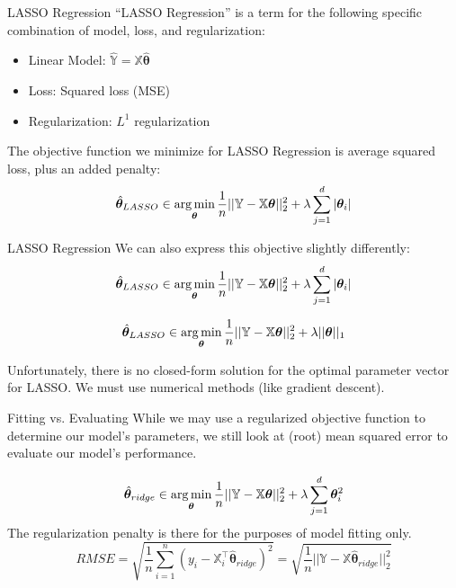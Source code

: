 \documentclass[aspectratio=169]{../latex_main/tntbeamer}  %
\begin{document}
	
	\begin{frame}{LASSO  Regression}
	    “LASSO Regression” is a term for the following specific combination of model, loss, and regularization:
	    \begin{itemize}
	        \item Linear Model: $\mathbb{\hat{Y}} = \mathbb{X}\hat{\bm\theta}$
	        \item Loss: Squared loss (MSE)
	        \item Regularization: \alert{$L^1$ regularization}
	    \end{itemize}
	    \bigskip
	    The objective function we minimize for LASSO  Regression is average squared loss, plus an added penalty:
	    \begin{equation*}
	        \hat{\bm\theta}_{LASSO} \in \operatorname*{arg\,min}_{\bm\theta}\frac{1}{n}||\mathbb{Y} - \mathbb{X}\bm{\theta}||_2^2 + \lambda \sum_{j=1}^d|\bm{\theta}_i|
	    \end{equation*}
	\end{frame}
	
	
	
	\begin{frame}{LASSO  Regression}
	    We can also express this objective slightly differently:
	    \begin{equation*}
	        \hat{\bm\theta}_{LASSO} \in \operatorname*{arg\,min}_{\bm\theta}\frac{1}{n}||\mathbb{Y} - \mathbb{X}\bm{\theta}||_2^2 + \lambda \sum_{j=1}^d|\bm{\theta}_i|
	    \end{equation*}
	    
	    \begin{equation*}
	    	        \hat{\bm\theta}_{LASSO} \in \operatorname*{arg\,min}_{\bm\theta}\frac{1}{n}||\mathbb{Y} - \mathbb{X}\bm{\theta}||_2^2 + \lambda ||\bm{\theta} ||_1
	    \end{equation*}
	    \bigskip
	   
	   Unfortunately, there is no closed-form solution for the optimal parameter vector for LASSO. We must use numerical methods (like gradient descent).

	\end{frame}
	
	\begin{frame}{Fitting vs. Evaluating}
	While we may use a regularized objective function to determine our model’s parameters, we still look at (root) mean squared error to evaluate our model’s performance.
    
    \begin{equation*}
	        \hat{\bm{\theta}}_{ridge} \in \operatorname*{arg\,min}_{\bm\theta}\frac{1}{n}||\mathbb{Y} - \mathbb{X}\bm{\theta}||_2^2 + \lambda \sum_{j=1}^d\bm{\theta}_i^2 
    \end{equation*}
    The regularization penalty is there for the purposes of model fitting only.
    \begin{equation*}
        RMSE = \sqrt{\frac{1}{n}\sum\limits_{i=1}^n(y_i - \mathbb{X}_i^\intercal\hat{\bm\theta}_{ridge})^2} = \sqrt{\frac{1}{n}||\mathbb{Y} - \mathbb{X}\hat{\bm\theta}_{ridge}||_2^2}
    \end{equation*}
	\end{frame}
	
\end{document}
